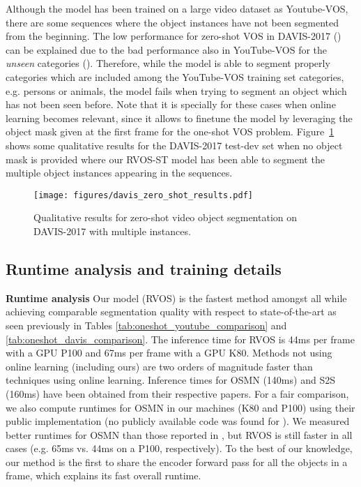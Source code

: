 \documentclass[10pt,twocolumn,letterpaper]{article}
\begin{document}
Although the model has been trained on a large video dataset as Youtube-VOS, there are some sequences where the object instances have not been segmented from the beginning. The low performance for zero-shot VOS in DAVIS-2017 () can be explained due to the bad performance also in YouTube-VOS for the \emph{unseen} categories (). Therefore, while the model is able to segment properly categories which are included among the YouTube-VOS training set categories, e.g. persons or animals, the model fails when trying to segment an object which has not been seen before. Note that it is specially for these cases when online learning becomes relevant, since it allows to finetune the model by leveraging the object mask given at the first frame for the one-shot VOS problem. Figure~\ref{fig:davis-zeroshot-qualitative-results} shows some qualitative results for the DAVIS-2017 test-dev set when no object mask is provided where our RVOS-ST model has been able to segment the multiple object instances appearing in the sequences. 



\begin{figure}
    \centering
    \texttt{[image: figures/davis\_zero\_shot\_results.pdf]}
    \caption{Qualitative results for zero-shot video object segmentation on DAVIS-2017 with multiple instances.}
\label{fig:davis-zeroshot-qualitative-results}
\end{figure}

\subsection{Runtime analysis and training details}

\textbf{Runtime analysis} Our model (RVOS) is the fastest method amongst all while achieving comparable segmentation quality with respect to state-of-the-art as seen previously in Tables \ref{tab:oneshot_youtube_comparison} and \ref{tab:oneshot_davis_comparison}. The inference time for RVOS is 44ms per frame with a GPU P100 and 67ms per frame with a GPU K80. Methods not using online learning (including ours) are two orders of magnitude faster than techniques using online learning. Inference times for OSMN \cite{yang2018efficient} (140ms) and S2S \cite{xu2018youtube-benchmark} (160ms) have been obtained from their respective papers. For a fair comparison, we also compute runtimes for OSMN \cite{yang2018efficient} in our machines (K80 and P100) using their public implementation (no publicly available code was found for \cite{xu2018youtube-benchmark}). 
We measured better runtimes for OSMN than those reported in \cite{yang2018efficient}, but RVOS is still faster in all cases (e.g. 65ms vs. 44ms on a P100, respectively).
To the best of our knowledge, our method is the first to share the encoder forward pass for all the objects in a frame, which explains its fast overall runtime. 
\end{document}
